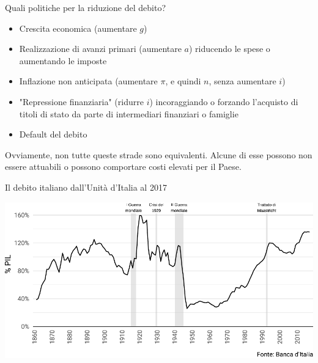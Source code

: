 \documentclass[aspectratio=149,11pt,italian]{beamer}
\begin{document}
\begin{frame}{Quali politiche per la riduzione del debito?}
\begin{itemize}
\item Crescita economica (aumentare $g$)
\item Realizzazione di avanzi primari (aumentare $a$) riducendo le spese o
aumentando le imposte
\item Inflazione non anticipata (aumentare $\pi$, e quindi $n$, senza aumentare
$i$)
\item "Repressione finanziaria" (ridurre $i$) incoraggiando o forzando l'acquisto
di titoli di stato da parte di intermediari finanziari o famiglie
\item Default del debito
\end{itemize}

Ovviamente, non tutte queste strade sono equivalenti. Alcune di esse possono
non essere attuabili o possono comportare costi elevati per il Paese.
\end{frame}

\begin{frame}{Il debito italiano dall'Unità d'Italia al 2017}
\begin{center}
\centering
\includegraphics[width=\textwidth]{./figure/debito-PIL-1861-2017.pdf}
\end{center}
\end{frame}
\end{document}
